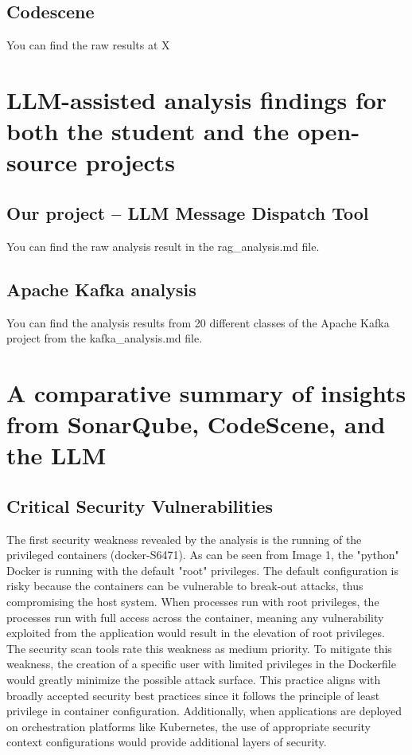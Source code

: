 \documentclass[sigconf]{acmart}
\begin{document}
\subsection{Codescene}
You can find the raw results at X

\section{LLM-assisted analysis findings for both the student and the open-source projects}
\subsection{Our project – LLM Message Dispatch Tool}
You can find the raw analysis result in the rag\_analysis.md file.

\subsection{Apache Kafka analysis}
You can find the analysis results from 20 different classes of the Apache Kafka project from the kafka\_analysis.md file.

\section{A comparative summary of insights from SonarQube, CodeScene, and the LLM}
\subsection{Critical Security Vulnerabilities}
The first security weakness revealed by the analysis is the running of the privileged containers (docker-S6471). As can be seen from Image 1, the "python" Docker is running with the default "root" privileges. The default configuration is risky because the containers can be vulnerable to break-out attacks, thus compromising the host system. When processes run with root privileges, the processes run with full access across the container, meaning any vulnerability exploited from the application would result in the elevation of root privileges. The security scan tools rate this weakness as medium priority. To mitigate this weakness, the creation of a specific user with limited privileges in the Dockerfile would greatly minimize the possible attack surface. This practice aligns with broadly accepted security best practices since it follows the principle of least privilege in container configuration. Additionally, when applications are deployed on orchestration platforms like Kubernetes, the use of appropriate security context configurations would provide additional layers of security.
\end{document}
